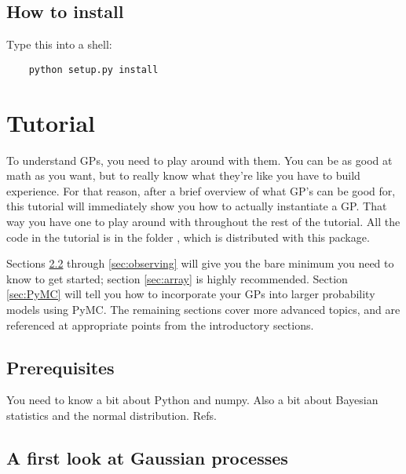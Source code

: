 \documentclass{manual}
\begin{document}
\section{How to install}\label{sec:installing}

Type this into a shell:
\begin{verbatim}
	python setup.py install
\end{verbatim}




\chapter{Tutorial}\label{cha:tutorial} 

To understand GPs, you need to play around with them. You can be as good at math as you want, but to really know what they're like you have to build experience. For that reason, after a brief overview of what GP's can be good for, this tutorial will immediately show you how to actually instantiate a GP. That way you have one to play around with throughout the rest of the tutorial. All the code in the tutorial is in the folder , which is distributed with this package.

Sections \ref{sec:firstlook} through \ref{sec:observing} will give you the bare minimum you need to know to get started; section \ref{sec:array} is highly recommended. Section \ref{sec:PyMC} will tell you how to incorporate your GPs into larger probability models using PyMC. The remaining sections cover more advanced topics, and are referenced at appropriate points from the introductory sections.

\section{Prerequisites}\label{sec:prerequisites}
You need to know a bit about Python and numpy. Also a bit about Bayesian statistics and the normal distribution. Refs. 

\section{A first look at Gaussian processes}\label{sec:firstlook} %
\end{document}
